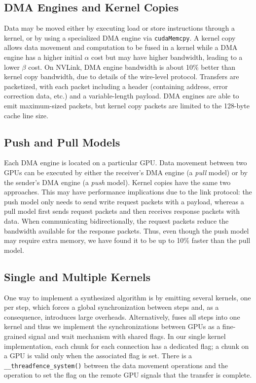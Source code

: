 \subsection{DMA Engines and Kernel Copies} Data may be moved either by
executing load or store instructions through a kernel, or by using a
specialized DMA engine via \texttt{cudaMemcpy}. A kernel copy allows
data movement and computation to be fused in a kernel while a DMA
engine has a higher initial $\alpha$ cost but may have higher
bandwidth, leading to a lower $\beta$ cost. On NVLink, DMA engine
bandwidth is about 10\% better than kernel copy bandwidth, due to
details of the wire-level protocol. Transfers are packetized, with
each packet including a header (containing address, error correction
data, etc.) and a variable-length payload. DMA engines are able to
emit maximum-sized packets, but kernel copy packets are limited to the
128-byte cache line size.

\subsection{Push and Pull Models} Each DMA engine is located on a
particular GPU. Data movement between two GPUs can be executed by
either the receiver's DMA engine (a {\em pull} model) or by the
sender's DMA engine (a {\em push} model). Kernel copies have the same
two approaches. This may have performance implications due to the link
protocol: the push model only needs to send write request packets with
a payload, whereas a pull model first sends request packets and then
receives response packets with data. When communicating
bidirectionally, the request packets reduce the bandwidth available
for the response packets. Thus, even though the push model may require
extra memory, we have found it to be up to 10\% faster than the pull
model.



\subsection{Single and Multiple Kernels} One way to implement a
synthesized algorithm is by emitting several kernels, one per step,
which forces a global synchronization between steps and, as a
consequence, introduces large overheads. Alternatively, \tool{} fuses
all steps into one kernel and thus we implement the synchronizations
between GPUs as a fine-grained signal and wait mechanism with shared
flags. In our single kernel implementation, each chunk for each
connection has a dedicated flag; a chunk on a GPU is valid only when
the associated flag is set. There is a
\texttt{\_\_threadfence\_system()} between the data movement
operations and the operation to set the flag on the remote GPU signals
that the transfer is complete.

